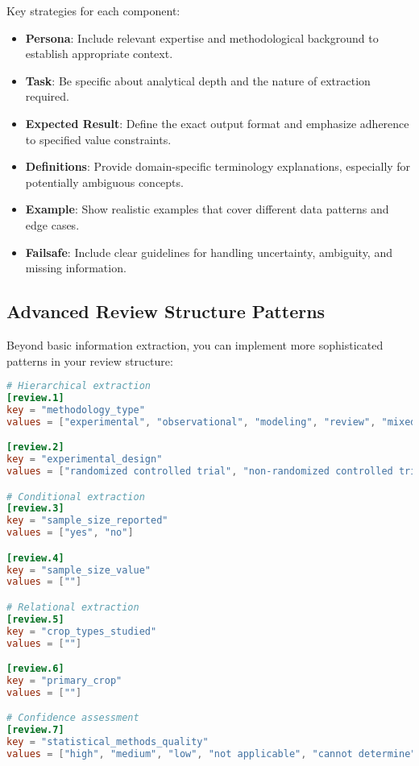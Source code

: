 Key strategies for each component:

\begin{itemize}
    \item \textbf{Persona}: Include relevant expertise and methodological background to establish appropriate context.
    \item \textbf{Task}: Be specific about analytical depth and the nature of extraction required.
    \item \textbf{Expected Result}: Define the exact output format and emphasize adherence to specified value constraints.
    \item \textbf{Definitions}: Provide domain-specific terminology explanations, especially for potentially ambiguous concepts.
    \item \textbf{Example}: Show realistic examples that cover different data patterns and edge cases.
    \item \textbf{Failsafe}: Include clear guidelines for handling uncertainty, ambiguity, and missing information.
\end{itemize}


\subsection{Advanced Review Structure Patterns}

Beyond basic information extraction, you can implement more sophisticated patterns in your review structure:

\begin{configbox}
\begin{lstlisting}[language=TOML]
# Hierarchical extraction
[review.1]
key = "methodology_type"
values = ["experimental", "observational", "modeling", "review", "mixed", "other", ""]

[review.2]
key = "experimental_design"
values = ["randomized controlled trial", "non-randomized controlled trial", "before-after", "other", "not applicable", ""]

# Conditional extraction
[review.3]
key = "sample_size_reported"
values = ["yes", "no"]

[review.4]
key = "sample_size_value"
values = [""]

# Relational extraction
[review.5]
key = "crop_types_studied"
values = [""]

[review.6]
key = "primary_crop"
values = [""]

# Confidence assessment
[review.7]
key = "statistical_methods_quality"
values = ["high", "medium", "low", "not applicable", "cannot determine", ""]

\end{lstlisting}
\end{configbox}


